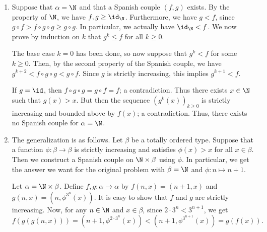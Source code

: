 \begin{enumerate}[label=(\alph*)]

    \item
    Suppose that $\alpha = \N$ and that a Spanish couple $(f, g)$ exists.
    By the property of $\N$, we have $f, g \geq \id_{\N}$.
    Furthermore, we have $g < f$, since $g \circ f > f \circ g \circ g \geq g \circ g$.
    In particular, we actually have $\id_{\N} < f$.
    We now prove by induction on $k$ that $g^k \leq f$ for all $k \geq 0$.

    The base case $k = 0$ has been done, so now suppose that $g^k < f$ for some $k \geq 0$.
    Then, by the second property of the Spanish couple, we have $g^{k + 2} < f \circ g \circ g < g \circ f$.
    Since $g$ is strictly increasing, this implies $g^{k + 1} < f$.

    If $g = \id$, then $f \circ g \circ g = g \circ f = f$; a contradiction.
    Thus there exists $x \in \N$ such that $g(x) > x$.
    But then the sequence $(g^k(x))_{k \geq 0}$ is strictly increasing and bounded above by $f(x)$; a contradiction.
    Thus, there exists no Spanish couple for $\alpha = \N$.

    
    
    \item
    The generalization is as follows.
    Let $\beta$ be a totally ordered type.
    Suppose that a function $\phi : \beta \to \beta$ is strictly increasing and satisfies $\phi(x) > x$ for all $x \in \beta$.
    Then we construct a Spanish couple on $\N \times \beta$ using $\phi$.
    In particular, we get the answer we want for the original problem with $\beta = \N$ and $\phi : n \mapsto n + 1$.
    
    Let $\alpha = \N \times \beta$.
    Define $f, g : \alpha \to \alpha$ by $f(n, x) = (n + 1, x)$ and $g(n, x) = (n, \phi^{3^n}(x))$.
    It is easy to show that $f$ and $g$ are strictly increasing.
    Now, for any $n \in \N$ and $x \in \beta$, since $2 \cdot 3^n < 3^{n + 1}$, we get
    \[ f(g(g(n, x))) = (n + 1, \phi^{2 \cdot 3^n}(x)) < (n + 1, \phi^{3^{n + 1}}(x)) = g(f(x)). \]



\end{enumerate}
